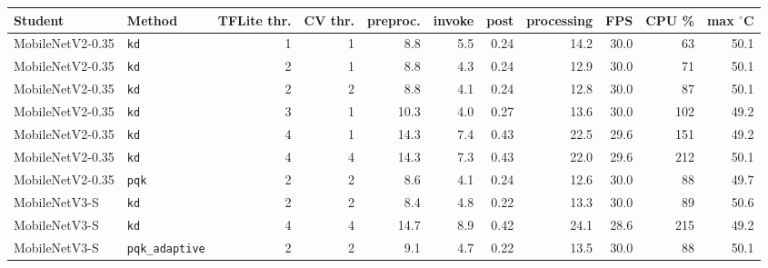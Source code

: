 \begin{tabular}{@{}llrrrrrrrrr@{}}
\toprule
Student & Method & TFLite thr. & CV thr. & preproc. & invoke & post & processing & FPS & CPU \% & max $^\circ$C \\
\midrule
MobileNetV2-0.35 & \texttt{kd} & 1 & 1 & 8.8 & 5.5 & 0.24 & 14.2 & 30.0 & 63 & 50.1 \\
MobileNetV2-0.35 & \texttt{kd} & 2 & 1 & 8.8 & 4.3 & 0.24 & 12.9 & 30.0 & 71 & 50.1 \\
MobileNetV2-0.35 & \texttt{kd} & 2 & 2 & 8.8 & 4.1 & 0.24 & 12.8 & 30.0 & 87 & 50.1 \\
MobileNetV2-0.35 & \texttt{kd} & 3 & 1 & 10.3 & 4.0 & 0.27 & 13.6 & 30.0 & 102 & 49.2 \\
MobileNetV2-0.35 & \texttt{kd} & 4 & 1 & 14.3 & 7.4 & 0.43 & 22.5 & 29.6 & 151 & 49.2 \\
MobileNetV2-0.35 & \texttt{kd} & 4 & 4 & 14.3 & 7.3 & 0.43 & 22.0 & 29.6 & 212 & 50.1 \\
MobileNetV2-0.35 & \texttt{pqk} & 2 & 2 & 8.6 & 4.1 & 0.24 & 12.6 & 30.0 & 88 & 49.7 \\
MobileNetV3-S & \texttt{kd} & 2 & 2 & 8.4 & 4.8 & 0.22 & 13.3 & 30.0 & 89 & 50.6 \\
MobileNetV3-S & \texttt{kd} & 4 & 4 & 14.7 & 8.9 & 0.42 & 24.1 & 28.6 & 215 & 49.2 \\
MobileNetV3-S & \texttt{pqk\_adaptive} & 2 & 2 & 9.1 & 4.7 & 0.22 & 13.5 & 30.0 & 88 & 50.1 \\
\bottomrule
\end{tabular}
